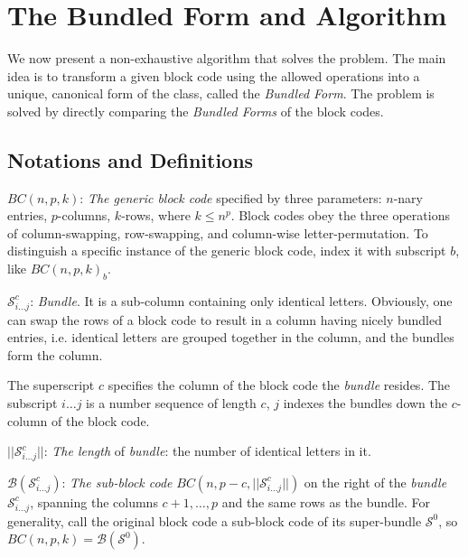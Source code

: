 \documentclass[12pt]{article}  %
\begin{document}
\section{The Bundled Form and Algorithm}
We now present a non-exhaustive algorithm that solves the problem. The main idea is to transform a given block code using the allowed operations into a unique, canonical form of the class, called the \textit{Bundled Form}. The problem is solved by directly comparing the \textit{Bundled Forms} of the block codes.














\subsection{Notations and Definitions}
$BC(n,p,k)$: \emph{The generic block code} specified by three parameters: $n$-nary entries, $p$-columns, $k$-rows, where $k \leq n^p$. Block codes obey the three operations of column-swapping, row-swapping, and column-wise letter-permutation. To distinguish a specific instance of the generic block code, index it with subscript $b$, like $BC(n,p,k)_b$.


$\mathcal{S}^c_{i\dots j}$: \emph{Bundle}. It is a sub-column containing only identical letters. Obviously, one can swap the rows of a block code to result in a column having nicely bundled entries, i.e. identical letters are grouped together in the column, and the bundles form the column.


The superscript $c$ specifies the column of the block code the \emph{bundle} resides. The subscript $i\dots j$ is a number sequence of length $c$, $j$ indexes the bundles down the $c$-column of the block code.



$||\mathcal{S}^c_{i\dots j}||$: \emph{The length} of \emph{bundle}: the number of identical letters in it.


$\mathcal{B}(\mathcal{S}^c_{i\dots j})$: \emph{The sub-block code} $BC(n, p-c, ||\mathcal{S}^c_{i\dots j}||)$ on the right of the \emph{bundle} $\mathcal{S}^c_{i\dots j}$, spanning the columns $c+1,\dots,p$ and the same rows as the bundle. For generality, call the original block code a sub-block code of its super-bundle $\mathcal{S}^0$, so $BC(n,p,k) = \mathcal{B}(\mathcal{S}^0)$.
\end{document}
